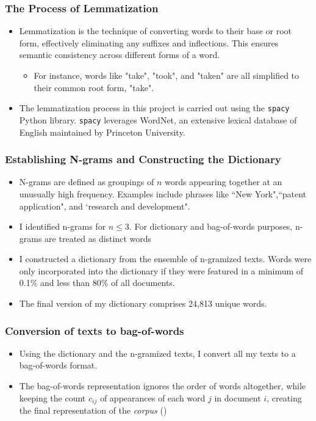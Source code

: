 \documentclass{beamer}
\begin{document}
\begin{frame}
\frametitle{The Process of Lemmatization}
\begin{itemize}
\item Lemmatization is the technique of converting words to their base or root form, effectively eliminating any suffixes and inflections. This ensures semantic consistency across different forms of a word.
\begin{itemize}
  \item For instance, words like "take", "took", and "taken" are all simplified to their common root form, "take".
\end{itemize}
\item The lemmatization process in this project is carried out using the \texttt{spacy} Python library. \texttt{spacy} leverages WordNet, an extensive lexical database of English maintained by Princeton University. 
\end{itemize}
\end{frame}

\begin{frame}
\frametitle{Establishing N-grams and Constructing the Dictionary}
\label{ngram_main}
\begin{itemize}
\item N-grams are defined as groupings of $n$ words appearing together at an unusually high frequency. Examples include phrases like ``New York",``patent application", and `research and development".\hyperlink{ngram_details}{}

\item I identified n-grams for $n \leq 3$. For dictionary and bag-of-words purposes, n-grams are treated as distinct words
\item I constructed a dictionary from the ensemble of n-gramized texts. Words were only incorporated into the dictionary if they were featured in a minimum of 0.1\% and less than 80\% of all documents.

\item The final version of my dictionary comprises 24,813 unique words.
\end{itemize}
\normalsize
\end{frame}

\begin{frame}
\frametitle{Conversion of texts to bag-of-words}
\begin{itemize}
\item Using the dictionary and the n-gramized texts, I convert all my texts to a bag-of-words format.
\item The bag-of-words representation ignores the order of words altogether, while keeping the count $c_{ij}$ of appearances of each word $j$ in document $i$, creating the final representation of the \textit{corpus} (\cite{Gentzkow2019-va})
\end{itemize}
\end{frame}
\end{document}
